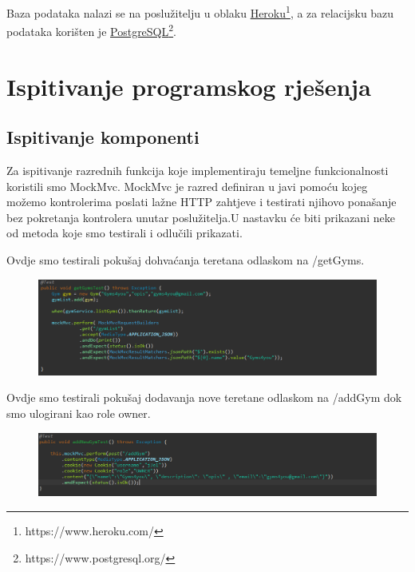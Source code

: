 			\textit{}Baza podataka nalazi se na poslužitelju u oblaku \underline{Heroku}\footnote[13]{https://www.heroku.com/}, a za relacijsku bazu 
			podataka korišten je \underline{PostgreSQL}\footnote[14]{https://www.postgresql.org/}.
			
			\eject 
		
	
		\section{Ispitivanje programskog rješenja}	
			
			\subsection{Ispitivanje komponenti}
			
			Za ispitivanje razrednih funkcija koje implementiraju temeljne funkcionalnosti koristili smo MockMvc. MockMvc je razred definiran u javi pomoću kojeg možemo kontrolerima poslati lažne HTTP zahtjeve i testirati njihovo  ponašanje bez pokretanja kontrolera unutar poslužitelja.U nastavku će biti prikazani neke od metoda koje smo testirali i odlučili prikazati.
			
			 \noindent {}
			 
             Ovdje smo testirali pokušaj dohvaćanja teretana odlaskom na /getGyms.

			\begin{figure}[H]
    			\hspace*{-1.5cm}
    			\includegraphics[scale=0.5]{slike/getGyms.PNG} %
    			\centering
    			\label{fig:promjene}
    	    \end{figure}
	

			\noindent {}
			
            Ovdje smo testirali pokušaj dodavanja nove teretane odlaskom na /addGym  dok smo ulogirani kao role owner.

			\begin{figure}[H]
    			\hspace*{-1.5cm}
    			\includegraphics[scale=0.5]{slike/addNewGym.PNG} %
    			\centering
    			\label{fig:promjene}
    	    \end{figure}
	

